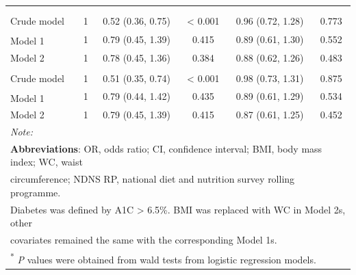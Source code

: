 \begin{table}[H]
\begin{tabular}[t]{lccccc}
		\addlinespace[0.3em]
		\multicolumn{6}{l}{\textbf{Women (n = 3618)}}\\
		\addlinespace[0.3em]
		\multicolumn{6}{l}{\hspace{1em}\textbf{Hypertension}}\\
		\hspace{1em}\hspace{1em}Crude model & 1 & 0.52 (0.36, 0.75) & < 0.001 & 0.96 (0.72, 1.28) & 0.773\\
		\hspace{1em}\hspace{1em}Model 1\textsuperscript{\ddag} & 1 & 0.79 (0.45, 1.39) & 0.415 & 0.89 (0.61, 1.30) & 0.552\\
		\hspace{1em}\hspace{1em}Model 2 & 1 & 0.78 (0.45, 1.36) & 0.384 & 0.88 (0.62, 1.26) & 0.483\\
		\addlinespace[0.3em]
		\multicolumn{6}{l}{\hspace{1em}\textbf{Hypertension in non-diabetics}}\\
		\hspace{1em}\hspace{1em}Crude model & 1 & 0.51 (0.35, 0.74) & < 0.001 & 0.98 (0.73, 1.31) & 0.875\\
		\hspace{1em}\hspace{1em}Model 1\textsuperscript{\ddag} & 1 & 0.79 (0.44, 1.42) & 0.435 & 0.89 (0.61, 1.29) & 0.534\\
		\hspace{1em}\hspace{1em}Model 2 & 1 & 0.79 (0.45, 1.39) & 0.415 & 0.87 (0.61, 1.25) & 0.452\\
		\bottomrule
		\multicolumn{6}{l}{{\scriptsize \textit{Note: }}}\\
		\multicolumn{6}{l}{{\scriptsize \textbf{Abbreviations}: OR, odds ratio; CI, confidence interval; BMI, body mass index; WC, waist}}\\
		\multicolumn{6}{l}{{\scriptsize  circumference; NDNS RP, national diet and nutrition survey rolling programme.}}\\
		\multicolumn{6}{l}{{\scriptsize Diabetes was defined by A1C > 6.5\%. BMI was replaced with WC in Model 2s, other}}\\
		\multicolumn{6}{l}{{\scriptsize covariates remained the same with the corresponding Model 1s.}}\\
		\multicolumn{6}{l}{{\scriptsize \textsuperscript{*} \textit{P} values were obtained from wald tests from logistic regression models.}}\\ 

\end{tabular}
\end{table}
